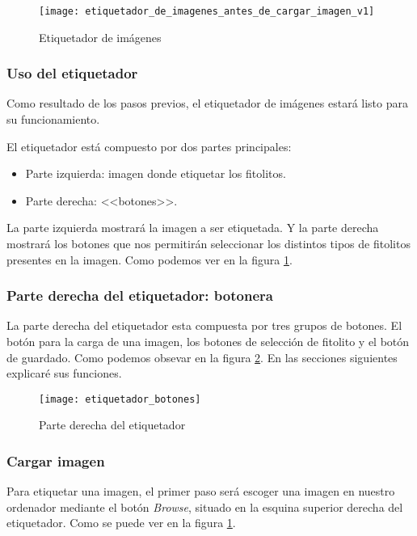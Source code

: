 \begin{figure}[h]
\centering
\texttt{[image: etiquetador\_de\_imagenes\_antes\_de\_cargar\_imagen\_v1]}
\caption{Etiquetador de imágenes}
\label{fig:E.4.3}
\end{figure}

\subsubsection{Uso del etiquetador}

Como resultado de los pasos previos, el etiquetador de imágenes estará listo para su funcionamiento. 

El etiquetador está compuesto por dos partes principales:

\begin{itemize}
	\item Parte izquierda: imagen donde etiquetar los fitolitos.
	\item Parte derecha: \textrm{<<botones>>}.	
\end{itemize}

La parte izquierda mostrará la imagen a ser etiquetada. Y la parte derecha mostrará los botones que nos permitirán seleccionar los distintos tipos de fitolitos presentes en la imagen. Como podemos ver en la figura \ref{fig:E.4.3}.

\subsubsection{Parte derecha del etiquetador: botonera}
La parte derecha del etiquetador esta compuesta por tres grupos de botones. El botón para la carga de una imagen, los botones de selección de fitolito y el botón de guardado. Como podemos obsevar en la figura \ref{fig:E.4.7}. En las secciones siguientes explicaré sus funciones. 

\begin{figure}[h]
\centering
\texttt{[image: etiquetador\_botones]}
\caption{Parte derecha del etiquetador}
\label{fig:E.4.7}
\end{figure}

\subsubsection{Cargar imagen}

Para etiquetar una imagen, el primer paso será escoger una imagen en nuestro ordenador mediante el botón \textit{Browse}, situado en la esquina superior derecha del etiquetador. Como se puede ver en la figura \ref{fig:E.4.3}.

